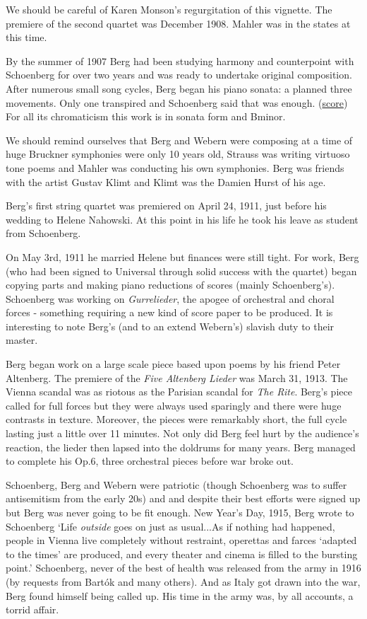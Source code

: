 We should be careful of Karen Monson's regurgitation of this vignette. The premiere of the second quartet was December 1908. Mahler was in the states at this time. 

By the summer of 1907 Berg had been studying harmony and counterpoint with Schoenberg for over two years and was ready to undertake original composition. After numerous small song cycles, Berg began his piano sonata: a planned three movements. Only one transpired and Schoenberg said that was enough. (\href{http://petrucci.mus.auth.gr/imglnks/usimg/7/75/IMSLP234327-SIBLEY1802.21900.4ff7-39087012041663score.pdf}{score})
For all its chromaticism this work is in sonata form and Bminor. 

We should remind ourselves that Berg and Webern were composing at a time of huge Bruckner symphonies were only 10 years old, Strauss was writing virtuoso tone poems and Mahler was conducting his own symphonies. 
Berg was friends with the artist Gustav Klimt and Klimt was the Damien Hurst of his age. 

Berg's first string quartet was premiered on April 24, 1911, just before his wedding to Helene Nahowski. At this point in his life he took his leave as student from Schoenberg. 

On May 3rd, 1911 he married Helene but finances were still tight. For work, Berg (who had been signed to Universal through solid success with the quartet) began copying parts and making piano reductions of scores (mainly Schoenberg's). Schoenberg was working on \textit{Gurrelieder}, the apogee of orchestral and choral forces - something requiring a new kind of score paper to be produced. It is interesting to note Berg's (and to an extend Webern's) slavish duty to their master.  

Berg began work on a large scale piece based upon poems by his friend Peter Altenberg. The premiere of the \textit{Five Altenberg Lieder} was March 31, 1913. The Vienna scandal was as riotous as the Parisian scandal for \textit{The Rite}. Berg's piece called for full forces but they were always used sparingly and there were huge contrasts in texture. Moreover, the pieces were remarkably short, the full cycle lasting just a little over 11 minutes. Not only did Berg feel hurt by the audience's reaction, the lieder then lapsed into the doldrums for many years. Berg managed to complete his Op.6, three orchestral pieces before war broke out. 

Schoenberg, Berg and Webern were patriotic (though Schoenberg was to suffer antisemitism from the early 20s) and and despite their best efforts were signed up but Berg was never going to be fit enough. New Year's Day, 1915, Berg wrote to Schoenberg `Life \textit{outside} goes on just as usual...As if nothing had happened, people in Vienna live completely without restraint, operettas and farces `adapted to the times' are produced, and every theater and cinema is filled to the bursting point.' Schoenberg, never of the best of health was released from the army in 1916 (by requests from Bart\'ok and many others). And as Italy got drawn into the war, Berg found himself being called up. His time in the army was, by all accounts, a torrid affair.  

